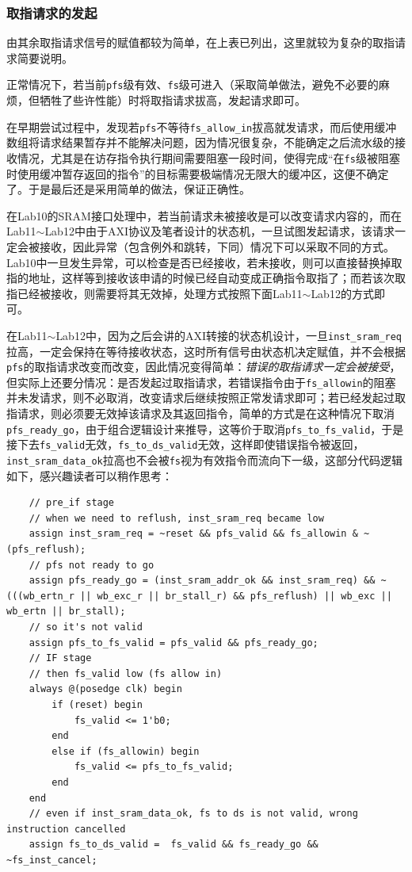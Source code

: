 \documentclass[UTF-8,twoside,c5size]{ctexart}
\begin{document}
	\subsubsection{取指请求的发起}
	
	由其余取指请求信号的赋值都较为简单，在上表已列出，这里就较为复杂的取指请求简要说明。
	
	正常情况下，若当前\texttt{pfs}级有效、\texttt{fs}级可进入（采取简单做法，避免不必要的麻烦，但牺牲了些许性能）时将取指请求拔高，发起请求即可。
	
	在早期尝试过程中，发现若\texttt{pfs}不等待\texttt{fs_allow_in}拔高就发请求，而后使用缓冲数组将请求结果暂存并不能解决问题，因为情况很复杂，不能确定之后流水级的接收情况，尤其是在访存指令执行期间需要阻塞一段时间，使得完成“{\kaishu 在\texttt{fs}级被阻塞时使用缓冲暂存返回的指令}”的目标需要极端情况无限大的缓冲区，这便不确定了。于是最后还是采用简单的做法，保证正确性。
		
	在Lab10的SRAM接口处理中，若当前请求未被接收是可以改变请求内容的，而在Lab11$\sim$Lab12中由于AXI协议及笔者设计的状态机，一旦试图发起请求，该请求一定会被接收，因此异常（包含例外和跳转，下同）情况下可以采取不同的方式。Lab10中一旦发生异常，可以检查是否已经接收，若未接收，则可以直接替换掉取指的地址，这样等到接收该申请的时候已经自动变成正确指令取指了；而若该次取指已经被接收，则需要将其无效掉，处理方式按照下面Lab11$\sim$Lab12的方式即可。
	
	在Lab11$\sim$Lab12中，因为之后会讲的AXI转接的状态机设计，一旦\texttt{inst_sram_req}拉高，一定会保持在等待接收状态，这时所有信号由状态机决定赋值，并不会根据\texttt{pfs}的取指请求改变而改变，因此情况变得简单：\textsl{错误的取指请求一定会被接受}，但实际上还要分情况：是否发起过取指请求，若错误指令由于\texttt{fs_allowin}的阻塞并未发请求，则不必取消，改变请求后继续按照正常发请求即可；若已经发起过取指请求，则必须要无效掉该请求及其返回指令，简单的方式是在这种情况下取消\texttt{pfs_ready_go}，由于组合逻辑设计来推导，这等价于取消\texttt{pfs_to_fs_valid}，于是接下去\texttt{fs_valid}无效，\texttt{fs_to_ds_valid}无效，这样即使错误指令被返回，\texttt{inst_sram_data_ok}拉高也不会被\texttt{fs}视为有效指令而流向下一级，这部分代码逻辑如下，感兴趣读者可以稍作思考：
	
    \begin{verbatim}
    // pre_if stage
    // when we need to reflush, inst_sram_req became low
    assign inst_sram_req = ~reset && pfs_valid && fs_allowin & ~(pfs_reflush);
    // pfs not ready to go
    assign pfs_ready_go = (inst_sram_addr_ok && inst_sram_req) && ~(((wb_ertn_r || wb_exc_r || br_stall_r) && pfs_reflush) || wb_exc || wb_ertn || br_stall);
    // so it's not valid
    assign pfs_to_fs_valid = pfs_valid && pfs_ready_go;
    // IF stage
    // then fs_valid low (fs allow in)
    always @(posedge clk) begin
        if (reset) begin
            fs_valid <= 1'b0;
        end
        else if (fs_allowin) begin
            fs_valid <= pfs_to_fs_valid;
        end
    end
    // even if inst_sram_data_ok, fs to ds is not valid, wrong instruction cancelled
    assign fs_to_ds_valid =  fs_valid && fs_ready_go && ~fs_inst_cancel;
    \end{verbatim}
		
\end{document}
